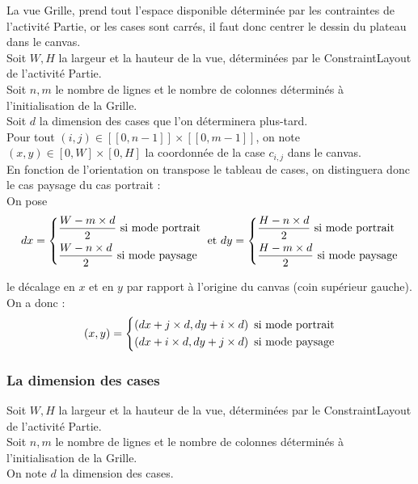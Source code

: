 \documentclass{article}
\begin{document}
La vue Grille, prend tout l'espace disponible déterminée par  les contraintes de l'activité Partie, or les cases sont carrés, il faut donc centrer le dessin du plateau dans le canvas.\\

\noindent Soit $W,H$ la largeur et la hauteur de la vue, déterminées par le ConstraintLayout de l'activité Partie.\\
Soit $n,m$ le nombre de lignes et le nombre de colonnes déterminés à l'initialisation de la Grille.\\
Soit $d$ la dimension des cases que l'on déterminera plus-tard.\\
Pour tout $(i,j)\in [\![0, n-1]\!]\times [\![0, m-1]\!]$, on note $(x,y)\in [0, W]\times [0, H]$ la coordonnée de la case $c_{i,j}$ dans le canvas.\\

\noindent En fonction de l'orientation on transpose le tableau de cases, on distinguera donc le cas paysage du cas portrait :\\

\noindent On pose 
$$dx = \begin{dcases}
    \frac{W-m\times d}{2} \text{ si mode portrait} \\
    \frac{W-n\times d}{2} \text{ si mode paysage}
\end{dcases} \text{ et } dy = \begin{dcases}
    \frac{H-n\times d}{2} \text{ si mode portrait} \\
    \frac{H-m\times d}{2} \text{ si mode paysage}
\end{dcases}$$ 

le décalage en $x$ et en $y$ par rapport  à l'origine du canvas (coin supérieur gauche). On a donc : \\

$$(x,y) = \begin{dcases}
    \left( dx+j\times d, dy+i\times d\right) \text{ si mode portrait} \\
    \left( dx+i\times d, dy+j\times d\right) \text{ si mode paysage}
\end{dcases}$$



\subsubsection{La dimension des cases}
\noindent Soit $W,H$ la largeur et la hauteur de la vue, déterminées par le ConstraintLayout de l'activité Partie.\\
Soit $n,m$ le nombre de lignes et le nombre de colonnes déterminés à l'initialisation de la Grille.\\
On note $d$ la dimension des cases.\\
\end{document}
